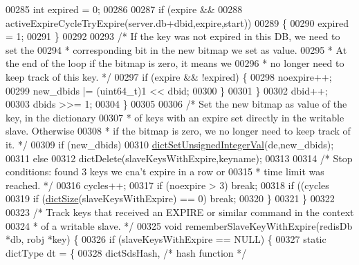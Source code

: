 \begin{DoxyCode}
{{{{{00285                 \textcolor{keywordtype}{int} expired = 0;
00286 
00287                 \textcolor{keywordflow}{if} (expire &&
00288                     activeExpireCycleTryExpire(server.db+dbid,expire,start))
00289                 \{
00290                     expired = 1;
00291                 \}
00292 
00293                 \textcolor{comment}{/* If the key was not expired in this DB, we need to set the}
00294 \textcolor{comment}{                 * corresponding bit in the new bitmap we set as value.}
00295 \textcolor{comment}{                 * At the end of the loop if the bitmap is zero, it means we}
00296 \textcolor{comment}{                 * no longer need to keep track of this key. */}
00297                 \textcolor{keywordflow}{if} (expire && !expired) \{
00298                     noexpire++;
00299                     new\_dbids |= (uint64\_t)1 << dbid;
00300                 \}
00301             \}
00302             dbid++;
00303             dbids >>= 1;
00304         \}
00305 
00306         \textcolor{comment}{/* Set the new bitmap as value of the key, in the dictionary}
00307 \textcolor{comment}{         * of keys with an expire set directly in the writable slave. Otherwise}
00308 \textcolor{comment}{         * if the bitmap is zero, we no longer need to keep track of it. */}
00309         \textcolor{keywordflow}{if} (new\_dbids)
00310             \hyperlink{dict_8h_aa846a3c28ad69004259435fd44246e10}{dictSetUnsignedIntegerVal}(de,new\_dbids);
00311         \textcolor{keywordflow}{else}
00312             dictDelete(slaveKeysWithExpire,keyname);
00313 
00314         \textcolor{comment}{/* Stop conditions: found 3 keys we cna't expire in a row or}
00315 \textcolor{comment}{         * time limit was reached. */}
00316         cycles++;
00317         \textcolor{keywordflow}{if} (noexpire > 3) \textcolor{keywordflow}{break};
00318         \textcolor{keywordflow}{if} ((cycles %
00319         \textcolor{keywordflow}{if} (\hyperlink{dict_8h_af193430dd3d5579a52b194512f72c1f0}{dictSize}(slaveKeysWithExpire) == 0) \textcolor{keywordflow}{break};
00320     \}
00321 \}
00322 
00323 \textcolor{comment}{/* Track keys that received an EXPIRE or similar command in the context}
00324 \textcolor{comment}{ * of a writable slave. */}
00325 \textcolor{keywordtype}{void} rememberSlaveKeyWithExpire(redisDb *db, robj *key) \{
00326     \textcolor{keywordflow}{if} (slaveKeysWithExpire == NULL) \{
00327         \textcolor{keyword}{static} dictType dt = \{
00328             dictSdsHash,                \textcolor{comment}{/* hash function */}
}}}}}
\end{DoxyCode}
